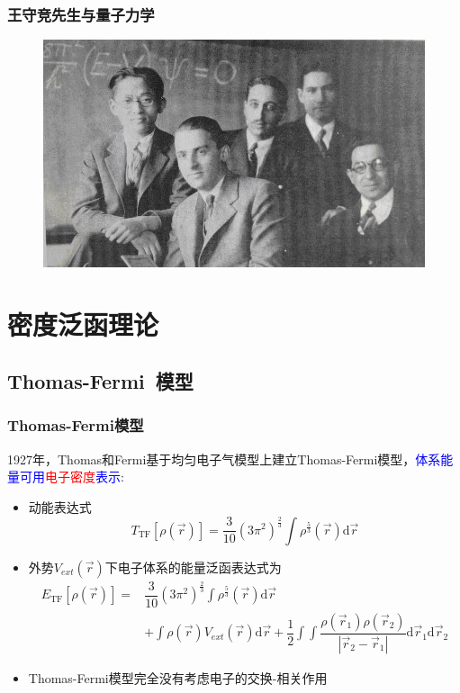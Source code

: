 \frame
{
	\frametitle{王守竞先生与量子力学}
\begin{figure}[h!]
\centering
\vspace{-10.5pt}
\includegraphics[height=0.65\textwidth,width=1.0\textwidth,viewport=0 0 560 350,clip]{Figures/Collect_Wang.jpg}
\caption{\fontsize{7.2pt}{6.5pt}}
\label{Collect_Wang}
\end{figure}
}

\section{密度泛函理论}       %
\subsection{\rm{Thomas-Fermi~}模型}       %
\frame
{
	\frametitle{\textrm{Thomas-Fermi}模型} 
	1927年，\textrm{Thomas}和\textrm{Fermi}基于均匀电子气模型上建立\textrm{Thomas-Fermi}模型，\textcolor{blue}{体系能量可用}\textcolor{red}{电子密度}\textcolor{blue}{表示}:
	\begin{itemize}
		\item 动能表达式
			$$T_{\mathrm{TF}}[\rho(\vec r)]=\dfrac3{10}(3\pi^2)^{\frac23}\int\rho^{\frac53}(\vec r)\mathrm{d}\vec r$$
		\item 外势$V_{ext}(\vec r)$下电子体系的能量泛函表达式为
			\begin{displaymath}
				\begin{aligned}
					E_{\mathrm{TF}}[\rho(\vec r)]=&\dfrac3{10}(3\pi^2)^{\frac23}\int\rho^{\frac53}(\vec r)\mathrm{d}\vec r\\
					&+\int\rho(\vec r)V_{ext}(\vec r)\mathrm{d}\vec r+\dfrac12\int\int\dfrac{\rho(\vec r_1)\rho(\vec r_2)}{|\vec r_2-\vec r_1|}\mathrm{d}\vec r_1\mathrm{d}\vec r_2
				\end{aligned}
			\end{displaymath}
		\item \textrm{Thomas-Fermi}模型完全没有考虑电子的交换-相关作用
	\end{itemize}
}

